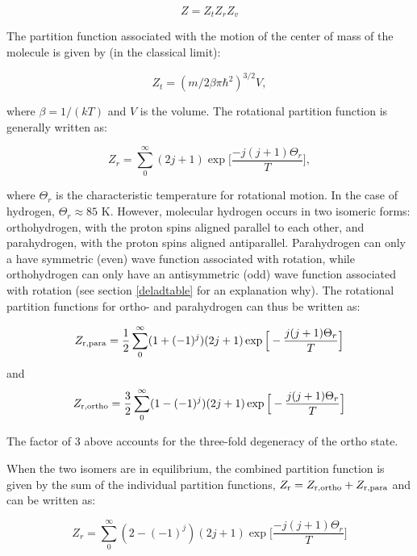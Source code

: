 \documentclass[apj]{emulateapj}
\begin{document}
\begin{equation}
\label{eq:zagain}
Z=Z_t Z_r Z_v
\end{equation} 

The partition function associated with the motion of the center of mass of the molecule is given by (in the classical limit):

\begin{equation}
\label{eq:Zt}
Z_t=(m/2 \beta \pi \hbar^2)^{3/2} V,
\end{equation}

\noindent where $\beta=1/(k T)$ and $V$ is the volume. The rotational partition function is generally written as:

\begin{equation}
\label{eq:Zr}
Z_r=\sum_0^\infty (2 j+1) \exp{\Big[\frac{-j (j+1)\Theta_r}{T}\Big]},
\end{equation}

\noindent where $\Theta_r$ is the characteristic temperature for rotational motion. In the case of hydrogen, $\Theta_r \approx 85$ K. However, molecular hydrogen occurs in two isomeric forms: orthohydrogen, with the proton spins aligned parallel to each other, and parahydrogen, with the proton spins aligned antiparallel. Parahydrogen can only a have symmetric (even) wave function associated with rotation, while orthohydrogen can only have an antisymmetric (odd) wave function associated with rotation (see section \ref{deladtable} for an explanation why). The rotational partition functions for ortho- and parahydrogen can thus be written as:

\begin{equation}
\label{eq:Zpara}
Z_{\rm{r,para}}=\frac{1}{2}\sum_0^\infty (1+(-1)^j) (2 j +1) \exp\Big[-\frac{j(j+1)\Theta_r}{T}\Big]
\end{equation}
and
\begin{equation}
\label{eq:Zortho}
Z_{\rm{r,ortho}}=\frac{3}{2}\sum_0^\infty (1-(-1)^j) (2 j +1) \exp\Big[-\frac{j(j+1)\Theta_r}{T}\Big]
\end{equation}

The factor of 3 above accounts for the three-fold degeneracy of the ortho state.

 When the two isomers are in equilibrium, the combined partition function is given by the sum of the individual partition functions, $Z_{\rm r}=Z_{\rm{r, ortho}}+Z_{\rm{r,para}}$ and can be written as:

\begin{equation}
\label{eq:Zrspin}
Z_r=\sum_0^\infty (2-(-1)^j) (2j+1) \exp{\Big[\frac{-j (j+1) \Theta_r}{T}\Big]}
\end{equation}
\end{document}
